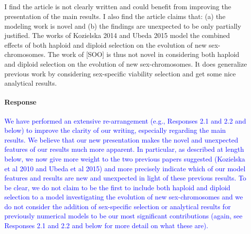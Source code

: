 \documentclass[10pt,letterpaper]{article}
\begin{document}
\noindent\subsection{}
I find the article is not clearly written and could benefit from improving the presentation of the main results. 
%
%
I also find the article claims that: (a) the modeling work is novel and (b) the findings are unexpected to be only partially justified.
%
%
The works of Kozielska 2014 and Ubeda 2015 model the combined effects of both haploid and diploid selection on the evolution of new sex-chromosomes. The work of [SOO] is thus not novel in considering both haploid and diploid selection on the evolution of new sex-chromosomes. It does generalize previous work by considering sex-specific viability selection and get some nice analytical results.

\noindent\paragraph{Response}
\textcolor{blue}{We have performed an extensive re-arrangement (e.g., Responses 2.1 and 2.2 and below) to improve the clarity of our writing, especially regarding the main results. 
We believe that our new presentation makes the novel and unexpected features of our results much more apparent. 
In particular, as described at length below, we now give more weight to the two previous papers suggested (Kozielska et al 2010 and Ubeda et al 2015) and more precisely indicate which of our model features and results are new and unexpected in light of these previous results.
To be clear, we do not claim to be the first to include both haploid and diploid selection to a model investigating the evolution of new sex-chromosomes and we do not consider the addition of sex-specific selection or analytical results for previously numerical models to be our most significant contributions (again, see Responses 2.1 and 2.2 and below for more detail on what these are). 
}
\end{document}
